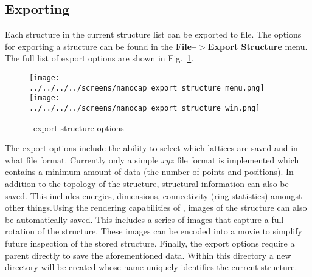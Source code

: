 \subsection{Exporting}

Each structure in the current structure list can be exported to file. The options for exporting a structure can be found in the \textbf{File--$>$Export Structure} menu. The full list of export options are shown in Fig.~\ref{export_struct_optionst}. 


 \begin{figure}[hp]
\centering
\texttt{[image: ../../../../screens/nanocap\_export\_structure\_menu.png]}
\texttt{[image: ../../../../screens/nanocap\_export\_structure\_win.png]}
\caption{\nanocap~export structure options}
\label{export_struct_optionst}
\end{figure}

The export options include the ability to select which lattices are saved and in what file format. Currently only a simple $xyz$ file format is implemented which contains a minimum amount of data (the number of points and positions). In addition to the topology of the structure, structural information can also be saved. This includes energies, dimensions, connectivity (ring statistics) amongst other things.Using the rendering capabilities of \nanocap, images of the structure can also be automatically saved. This includes a series of images that capture a full rotation of the structure. These images can be encoded into a movie to simplify future inspection of the stored structure. Finally, the export options require a parent directly to save the aforementioned data. Within this directory a new directory will be created whose name uniquely identifies the current structure.
